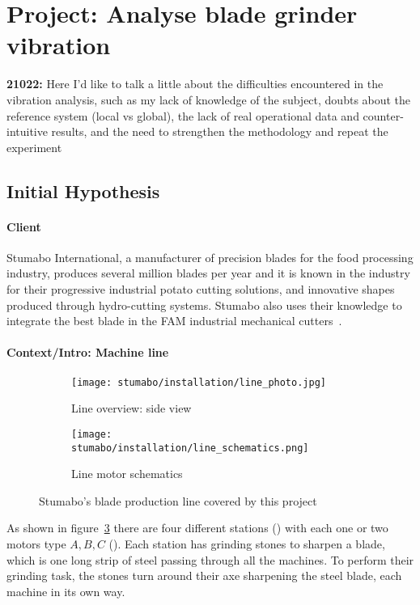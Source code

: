 \section{Project: Analyse blade grinder vibration}

\textbf{21022:} Here I'd like to talk a little about the difficulties encountered in the vibration analysis, such as my lack of knowledge of the subject, doubts about the reference system (local vs global),
the lack of real operational data and counter-intuitive results, and the need to strengthen the methodology and repeat the experiment


\subsection{Initial Hypothesis}
\paragraph{Client} Stumabo International, a manufacturer of precision blades for the food processing industry, produces several million blades per year and it is known in the industry for their progressive industrial potato cutting solutions,
and innovative shapes produced through hydro-cutting systems.
Stumabo also uses their knowledge to integrate the best blade in the FAM industrial mechanical cutters~\cite{Misc:stumabo_en_website}.

\paragraph{Context/Intro: Machine line}
\begin{figure}[ht]
    \begin{subfigure}{\textwidth}
        \texttt{[image: stumabo/installation/line\_photo.jpg]}
        \caption{Line overview: side view}
        \label{fig:line_overview}
    \end{subfigure}
    \begin{subfigure}{\textwidth}
        \texttt{[image: stumabo/installation/line\_schematics.png]}
        \caption{Line motor schematics}
        \label{fig:line_schematics}
    \end{subfigure}
    \caption{Stumabo's blade production line covered by this project}
    \label{fig:stumabo_prod_line}
\end{figure}

As shown in figure~\ref{fig:stumabo_prod_line} there are four different stations () with each one or two motors type ${A,B,C}$ ().
Each station has grinding stones to sharpen a blade, which is one long strip of steel passing through all the machines.
To perform their grinding task, the stones turn around their axe sharpening the steel blade, each machine in its own way.

